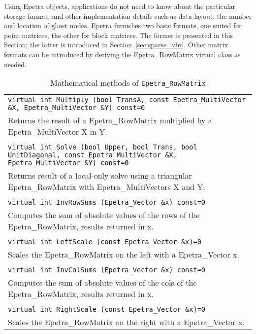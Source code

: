 Using Epetra objects, applications do not need to know about the
particular storage format, and other implementation details such as data
layout, the number and location of ghost nodes. Epetra furnishes two
basic formats, one suited for point matrices, the other for block
matrices.  The former is presented in this Section; the latter is
introduced in Section~\ref{sec:sparse_vbr}. Other matrix formats can be
introduced by deriving the Epetra\_RowMatrix virtual class as needed.

\begin{table}
\begin{center}
\begin{tabular}{ | p{15cm} | }
\hline
\tt virtual int 
Multiply (bool TransA, const Epetra\_MultiVector \&X, Epetra\_MultiVector
\&Y) const=0 \\
Returns the result of a Epetra\_RowMatrix multiplied by a
Epetra\_MultiVector X in Y.  \\
\\
\tt virtual int 
Solve (bool Upper, bool Trans, bool UnitDiagonal, const
Epetra\_MultiVector \&X, Epetra\_MultiVector \&Y) const=0 \\
Returns result of a local-only solve using a triangular Epetra\_RowMatrix with Epetra\_MultiVectors X and Y. \\
\\
\tt virtual int 
InvRowSums (Epetra\_Vector \&x) const=0 \\
Computes the sum of absolute values of the rows of the Epetra\_RowMatrix,
results returned in x.  \\
\\
\tt virtual int 
LeftScale (const Epetra\_Vector \&x)=0 \\
Scales the Epetra\_RowMatrix on the left with a Epetra\_Vector x.  \\
\\
\tt virtual int 
InvColSums (Epetra\_Vector \&x) const=0 \\
Computes the sum of absolute values of the cols of the Epetra\_RowMatrix,
results returned in x.  \\
\\
\tt virtual int 
RightScale (const Epetra\_Vector \&x)=0 \\
Scales the Epetra\_RowMatrix on the right with a Epetra\_Vector x.  \\
\hline
\end{tabular}
\caption{Mathematical methods of {\tt Epetra\_RowMatrix}}
\label{tab:row_matrix_math}
\end{center}
\end{table}

